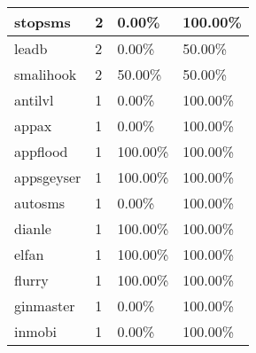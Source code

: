 \begin{table}[]
\begin{tabular}{|l|l|l|l|}
stopsms                                  & 2                                 & 0.00\%                                      & 100.00\%                               \\ \hline
leadb                                    & 2                                 & 0.00\%                                      & 50.00\%                                \\ \hline
smalihook                                & 2                                 & 50.00\%                                     & 50.00\%                                \\ \hline
antilvl                                  & 1                                 & 0.00\%                                      & 100.00\%                               \\ \hline
appax                                    & 1                                 & 0.00\%                                      & 100.00\%                               \\ \hline
appflood                                 & 1                                 & 100.00\%                                    & 100.00\%                               \\ \hline
appsgeyser                               & 1                                 & 100.00\%                                    & 100.00\%                               \\ \hline
autosms                                  & 1                                 & 0.00\%                                      & 100.00\%                               \\ \hline
dianle                                   & 1                                 & 100.00\%                                    & 100.00\%                               \\ \hline
elfan                                    & 1                                 & 100.00\%                                    & 100.00\%                               \\ \hline
flurry                                   & 1                                 & 100.00\%                                    & 100.00\%                               \\ \hline
ginmaster                                & 1                                 & 0.00\%                                      & 100.00\%                               \\ \hline
inmobi                                   & 1                                 & 0.00\%                                      & 100.00\%                               \\ \hline

\end{tabular}
\end{table}
